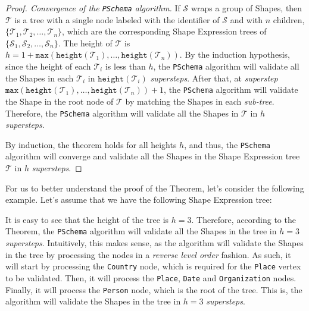 \begin{proof}[Proof. Convergence of the \texttt{PSchema} algorithm]
    If $\mathcal{S}$ wraps a group of Shapes, then $\mathcal{T}$ is a tree with a single node labeled with the identifier of $\mathcal{S}$ and with $n$ children, $\{\mathcal{T}_1, \mathcal{T}_2, \dots, \mathcal{T}_n\}$, which are the corresponding Shape Expression trees of $\{\mathcal{S}_1, \mathcal{S}_2, \dots, \mathcal{S}_n\}$. The height of $\mathcal{T}$ is $h = 1 + \texttt{max}(\texttt{height}(\mathcal{T}_1), \dots, \texttt{height}(\mathcal{T}_n))$. By the induction hypothesis, since the height of each $\mathcal{T}_i$ is less than $h$, the \texttt{PSchema} algorithm will validate all the Shapes in each $\mathcal{T}_i$ in $\texttt{height}(\mathcal{T}_i)$ \textit{supersteps}. After that, at \textit{superstep} $\texttt{max}(\texttt{height}(\mathcal{T}_1), \dots, \texttt{height}(\mathcal{T}_n)) + 1$, the \texttt{PSchema} algorithm will validate the Shape in the root node of $\mathcal{T}$ by matching the Shapes in each \textit{sub-tree}. Therefore, the \texttt{PSchema} algorithm will validate all the Shapes in $\mathcal{T}$ in $h$ \textit{supersteps}.

    By induction, the theorem holds for all heights $h$, and thus, the \texttt{PSchema} algorithm will converge and validate all the Shapes in the Shape Expression tree $\mathcal{T}$ in $h$ \textit{supersteps}.
\end{proof}

\vspace*{-1em}

\begin{example}
    For us to better understand the proof of the Theorem, let's consider the following example. Let's assume that we have the following Shape Expression tree:

    \begin{minipage}{0.45\textwidth}
        
    \end{minipage}%
    \hfill
    \begin{minipage}{0.45\textwidth}
        It is easy to see that the height of the tree is $h = 3$. Therefore, according to the Theorem, the \texttt{PSchema} algorithm will validate all the Shapes in the tree in $h = 3$ \textit{supersteps}. Intuitively, this makes sense, as the algorithm will validate the Shapes in the tree by processing the nodes in a \textit{reverse level order} fashion. As such, it will start by processing the \texttt{Country} node, which is required for the \texttt{Place} vertex to be validated. Then, it will process the \texttt{Place}, \texttt{Date} and \texttt{Organization} nodes. Finally, it will process the \texttt{Person} node, which is the root of the tree. This is, the algorithm will validate the Shapes in the tree in $h = 3$ \textit{supersteps}.
    \end{minipage}
\end{example}

